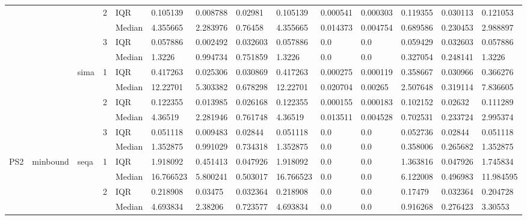 \begin{tabular}{llllllllllllll}
    &       &      & 2 & IQR &   0.105139 &   0.008788 &   0.02981 &   0.105139 &  0.000541 &  0.000303 &   0.119355 &  0.030113 &   0.121053 \\
    &       &      &   & Median &   4.355665 &   2.283976 &   0.76458 &   4.355665 &  0.014373 &  0.004754 &   0.689586 &  0.230453 &   2.988897 \\
    &       &      & 3 & IQR &   0.057886 &   0.002492 &  0.032603 &   0.057886 &       0.0 &       0.0 &   0.059429 &  0.032603 &   0.057886 \\
    &       &      &   & Median &     1.3226 &   0.994734 &  0.751859 &     1.3226 &       0.0 &       0.0 &   0.327054 &  0.248141 &     1.3226 \\
    &       & sima & 1 & IQR &   0.417263 &   0.025306 &  0.030869 &   0.417263 &  0.000275 &  0.000119 &   0.358667 &  0.030966 &   0.366276 \\
    &       &      &   & Median &   12.22701 &   5.303382 &  0.678298 &   12.22701 &  0.020704 &   0.00265 &   2.507648 &  0.319114 &   7.836605 \\
    &       &      & 2 & IQR &   0.122355 &   0.013985 &  0.026168 &   0.122355 &  0.000155 &  0.000183 &   0.102152 &   0.02632 &   0.111289 \\
    &       &      &   & Median &    4.36519 &   2.281946 &  0.761748 &    4.36519 &  0.013511 &  0.004528 &   0.702531 &  0.233724 &   2.995374 \\
    &       &      & 3 & IQR &   0.051118 &   0.009483 &   0.02844 &   0.051118 &       0.0 &       0.0 &   0.052736 &   0.02844 &   0.051118 \\
    &       &      &   & Median &   1.352875 &   0.991029 &  0.734318 &   1.352875 &       0.0 &       0.0 &   0.358006 &  0.265682 &   1.352875 \\
PS2 & minbound & seqa & 1 & IQR &   1.918092 &   0.451413 &  0.047926 &   1.918092 &       0.0 &       0.0 &   1.363816 &  0.047926 &   1.745834 \\
    &       &      &   & Median &  16.766523 &   5.800241 &  0.503017 &  16.766523 &       0.0 &       0.0 &   6.122008 &  0.496983 &  11.984595 \\
    &       &      & 2 & IQR &   0.218908 &    0.03475 &  0.032364 &   0.218908 &       0.0 &       0.0 &    0.17479 &  0.032364 &   0.204728 \\
    &       &      &   & Median &   4.693834 &    2.38206 &  0.723577 &   4.693834 &       0.0 &       0.0 &   0.916268 &  0.276423 &    3.30553 \\

\end{tabular}

